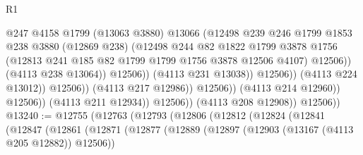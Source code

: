 \begin{lexlean}{R1}
\begin{coremodule}
                                              @247
                                              @4158
                                              @1799
                                              (@13063 @3880)
                                              @13066
                                              (@12498
                                                @239
                                                @246
                                                @1799
                                                @1853
                                                @238
                                                @3880
                                                (@12869 @238)
                                                (@12498
                                                  @244
                                                  @82
                                                  @1822
                                                  @1799
                                                  @3878
                                                  @1756
                                                  (@12813
                                                    @241
                                                    @185
                                                    @82
                                                    @1799
                                                    @1799
                                                    @1756
                                                    @3878
                                                    @12506
                                                    @4107)
                                                  @12506))
                                              (@4113 @238 @13064))
                                            @12506))
                                        (@4113 @231 @13038))
                                      @12506))
                                  (@4113 @224 @13012))
                                @12506))
                            (@4113 @217 @12986))
                          @12506))
                      (@4113 @214 @12960))
                    @12506))
                (@4113 @211 @12934))
              @12506))
          (@4113 @208 @12908))
        @12506))
@13240 := @12755
    (@12763
      (@12793
        (@12806
          (@12812
            (@12824
              (@12841
                (@12847
                  (@12861
                    (@12871
                      (@12877
                        (@12889
                          (@12897 (@12903 (@13167 (@4113 @205 @12882)) @12506))

\end{coremodule}
\end{lexlean}
